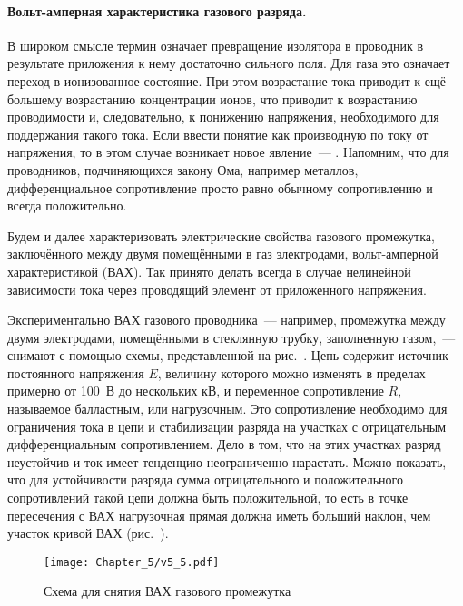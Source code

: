 \paragraph{Вольт-амперная характеристика газового разряда.}

В широком смысле термин  означает превращение
изолятора в проводник в результате приложения к
нему достаточно сильного поля. Для газа это означает переход в ионизованное
состояние. При этом возрастание тока
приводит к ещё большему возрастанию концентрации ионов, что приводит к
возрастанию проводимости и, следовательно, к
понижению напряжения, необходимого для поддержания такого тока. Если ввести
понятие  как производную по току от напряжения, то в этом случае возникает
новое явление~--- . Напомним, что для проводников, подчиняющихся
закону Ома, например металлов,
дифференциальное сопротивление просто равно обычному сопротивлению и всегда
положительно.

Будем и далее характеризовать электрические свойства газового промежутка,
заключённого между двумя помещёнными в газ
электродами, вольт-амперной характеристикой (ВАХ). Так принято делать всегда в
случае нелинейной зависимости тока через
проводящий элемент от приложенного напряжения.

Экспериментально ВАХ газового проводника~--- например, промежутка между двумя
электродами, помещёнными в стеклянную
трубку, заполненную газом,~--- снимают с помощью схемы, представленной на
рис.~. Цепь содержит источник постоянного
напряжения $E$, величину которого можно изменять в пределах примерно от 100~В до
нескольких кВ, и переменное
сопротивление $R$, называемое балластным, или нагрузочным. Это сопротивление
необходимо для ограничения тока в цепи и
стабилизации разряда на участках с отрицательным дифференциальным
сопротивлением. Дело в том, что на этих участках
разряд неустойчив и ток имеет тенденцию неограниченно нарастать. Можно показать,
что для устойчивости разряда сумма
отрицательного и положительного сопротивлений такой цепи должна быть
положительной, то есть в точке пересечения с ВАХ
нагрузочная прямая должна иметь больший наклон, чем участок кривой ВАХ
(рис.~).

\begin{figure}[h!]
	\centering
	\texttt{[image: Chapter\_5/v5\_5.pdf]}
	\caption{Схема для снятия ВАХ газового промежутка}
\end{figure}


